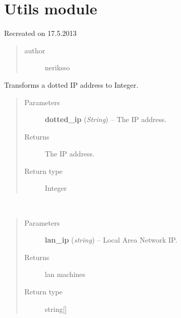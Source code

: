 \documentclass[letterpaper,10pt,english]{sphinxmanual}
\begin{document}
\section{Utils module}
\label{utils:utils-module}\label{utils:module-utils}\label{utils::doc}
Recreated on 17.5.2013
\begin{quote}\begin{description}
\item[{author}] \leavevmode
neriksso

\end{description}\end{quote}

\begin{fulllineitems}
\label{utils:utils.DottedIPToInt}
Transforms a dotted IP address to Integer.
\begin{quote}\begin{description}
\item[{Parameters}] \leavevmode
\textbf{dotted\_ip} (\emph{String}) -- The IP address.

\item[{Returns}] \leavevmode
The IP address.

\item[{Return type}] \leavevmode
Integer

\end{description}\end{quote}

\end{fulllineitems}


\begin{fulllineitems}
\label{utils:utils.GetLANMachines}~\begin{quote}\begin{description}
\item[{Parameters}] \leavevmode
\textbf{lan\_ip} (\emph{string}) -- Local Area Network IP.

\item[{Returns}] \leavevmode
lan machines

\item[{Return type}] \leavevmode
string{[}{]}

\end{description}\end{quote}

\end{fulllineitems}
\end{document}
